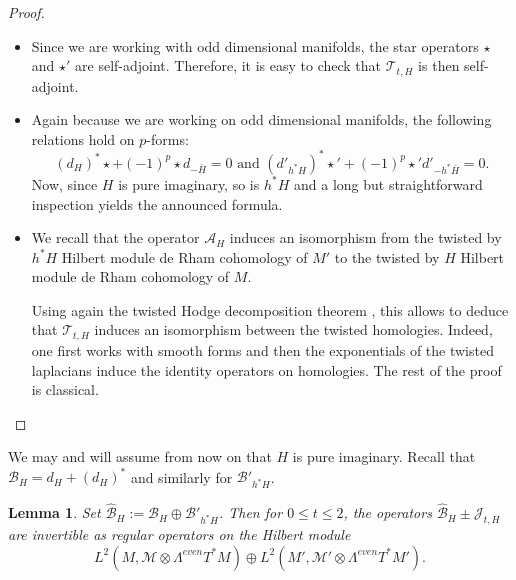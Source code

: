 \documentclass[12pt]{amsart}
\theoremstyle{plain}
\newtheorem{lemma}[theorem]{Lemma}
\theoremstyle{definition}
\theoremstyle{remark}
\begin{document}
{\begin{proof}
\begin{itemize}
\item Since we are working with odd dimensional manifolds, the star operators $\star$ and $\star'$ are self-adjoint. Therefore, it is easy to check that ${\mathcal T}_{t, H} $ is then self-adjoint.
\item Again because we are working on odd dimensional manifolds, the following relations hold on $p$-forms:
$$
 (d_H)^* \star + (-1)^p \star d_{-{\bar H}} = 0 \text{ and }  (d'_{h^*H})^* \star ' + (-1)^p \star ' d'_{-{h^*{\bar H}}} = 0.
$$
Now, since $H$ is pure imaginary, so is $h^*H$ and a long but straightforward  inspection yields the announced formula.
\item We recall  that the operator ${\mathcal A}_H$ induces an isomorphism from the twisted by $h^*H$ Hilbert module de Rham cohomology of $M'$ to the twisted by $H$ Hilbert module de Rham cohomology of $M$. 

Using again the twisted Hodge decomposition theorem \cite{MW}, this allows to deduce that ${\mathcal T}_{t, H}$ induces an isomorphism between the twisted homologies. Indeed, one first works with smooth forms and then the exponentials of the twisted laplacians induce the identity operators on homologies.  The rest of the proof is classical.
\end{itemize}
\end{proof}

We may and will assume from now on that $H$ is pure imaginary. Recall that ${\mathcal B}_H=d_H + (d_H)^*$ and similarly for ${\mathcal B}'_{h^*H}$.

\begin{lemma}
Set ${\hat{\mathcal B}}_H:= {\mathcal B}_H\oplus {\mathcal B}'_{h^* H}$. Then for  $0\leq t \leq 2$, the operators ${\hat{\mathcal B}}_H \pm {\mathcal J}_{t, H}$ are invertible as regular operators on the Hilbert module 
$$
L^2(M, {\mathcal M}\otimes \Lambda^{even}T^*M) \oplus L^2(M', {\mathcal M}'\otimes \Lambda^{even}T^*M').
$$
\end{lemma}

}
\end{document}
